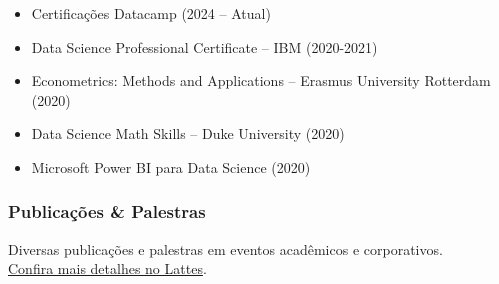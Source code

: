 \documentclass[
  letterpaper,
  DIV=11,
  numbers=noendperiod]{scrartcl}
\providecommand{\tightlist}{%
  \setlength{\itemsep}{0pt}\setlength{\parskip}{0pt}}\usepackage{longtable,booktabs,array}
\begin{document}
\begin{itemize}
\tightlist
\item
  Certificações Datacamp (2024 -- Atual)
\item
  Data Science Professional Certificate -- IBM (2020-2021)
\item
  Econometrics: Methods and Applications -- Erasmus University Rotterdam
  (2020)
\item
  Data Science Math Skills -- Duke University (2020)
\item
  Microsoft Power BI para Data Science (2020)
\end{itemize}

\subsubsection{Publicações \&
Palestras}\label{publicauxe7uxf5es-palestras}

Diversas publicações e palestras em eventos acadêmicos e corporativos.\\
\href{http://lattes.cnpq.br/3532649625879285}{Confira mais detalhes no
Lattes}.
\end{document}
